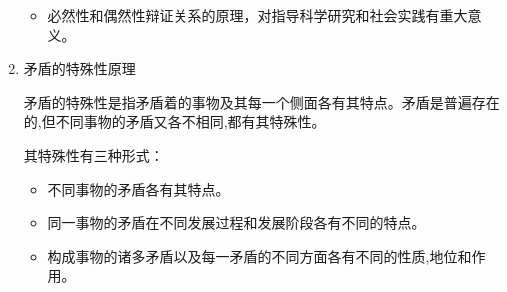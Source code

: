 \documentclass[device=pad,lang=cn,UTF8]{elegantbook}
\begin{document}
\begin{enumerate}
\begin{itemize}
\begin{itemize}
            \end{itemize}
            \item 必然性和偶然性辩证关系的原理，对指导科学研究和社会实践有重大意义。
        \end{itemize}
        \item 矛盾的特殊性原理\par
        矛盾的特殊性是指矛盾着的事物及其每一个侧面各有其特点。矛盾是普遍存在的,但不同事物的矛盾又各不相同,都有其特殊性。\par
        其特殊性有三种形式：
        \begin{itemize}
            \item 不同事物的矛盾各有其特点。
            \item 同一事物的矛盾在不同发展过程和发展阶段各有不同的特点。
            \item 构成事物的诸多矛盾以及每一矛盾的不同方面各有不同的性质,地位和作用。
        \end{itemize}
    \end{enumerate}
\end{document}
